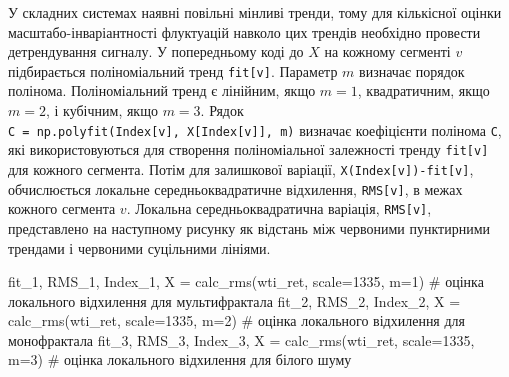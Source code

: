 \documentclass[
  letterpaper,
]{report}
\newenvironment{Shaded}{\begin{snugshade}}{\end{snugshade}}
\newcommand{\CommentTok}[1]{\textcolor[rgb]{0.37,0.37,0.37}{#1}}
\newcommand{\DecValTok}[1]{\textcolor[rgb]{0.68,0.00,0.00}{#1}}
\newcommand{\NormalTok}[1]{\textcolor[rgb]{0.00,0.23,0.31}{#1}}
\newcommand{\OperatorTok}[1]{\textcolor[rgb]{0.37,0.37,0.37}{#1}}
\begin{document}
У складних системах наявні повільні мінливі тренди, тому для кількісної
оцінки масштабо-інваріантності флуктуацій навколо цих трендів необхідно
провести детрендування сигналу. У попередньому коді до \(X\) на кожному
сегменті \(v\) підбирається поліноміальний тренд \texttt{fit{[}v{]}}.
Параметр \(m\) визначає порядок полінома. Поліноміальний тренд є
лінійним, якщо \(m = 1\), квадратичним, якщо \(m = 2\), і кубічним, якщо
\(m = 3\). Рядок
\texttt{C\ =\ np.polyfit(Index{[}v{]},\ X{[}Index{[}v{]}{]},\ m)}
визначає коефіцієнти полінома \texttt{C}, які використовуються для
створення поліноміальної залежності тренду \texttt{fit{[}v{]}} для
кожного сегмента. Потім для залишкової варіації,
\texttt{X(Index{[}v{]})-fit{[}v{]}}, обчислюється локальне
середньоквадратичне відхилення, \texttt{RMS{[}v{]}}, в межах кожного
сегмента \(v\). Локальна середньоквадратична варіація,
\texttt{RMS{[}v{]}}, представлено на наступному рисунку як відстань між
червоними пунктирними трендами і червоними суцільними лініями.

\begin{Shaded}
\begin{Highlighting}[]
\NormalTok{fit\_1, RMS\_1, Index\_1, X }\OperatorTok{=}\NormalTok{ calc\_rms(wti\_ret, scale}\OperatorTok{=}\DecValTok{1335}\NormalTok{, m}\OperatorTok{=}\DecValTok{1}\NormalTok{) }\CommentTok{\# оцінка локального відхилення для мультифрактала}
\NormalTok{fit\_2, RMS\_2, Index\_2, X }\OperatorTok{=}\NormalTok{ calc\_rms(wti\_ret, scale}\OperatorTok{=}\DecValTok{1335}\NormalTok{, m}\OperatorTok{=}\DecValTok{2}\NormalTok{) }\CommentTok{\# оцінка локального відхилення для монофрактала}
\NormalTok{fit\_3, RMS\_3, Index\_3, X }\OperatorTok{=}\NormalTok{ calc\_rms(wti\_ret, scale}\OperatorTok{=}\DecValTok{1335}\NormalTok{, m}\OperatorTok{=}\DecValTok{3}\NormalTok{) }\CommentTok{\# оцінка локального відхилення для білого шуму}
\end{Highlighting}
\end{Shaded}
\end{document}
